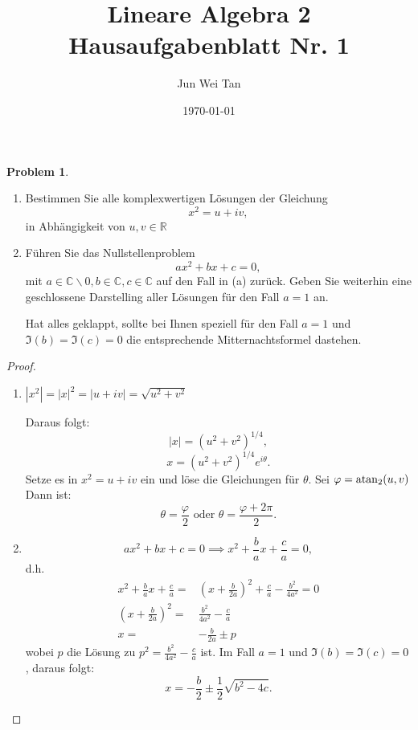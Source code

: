 \documentclass[prb,12pt]{revtex4-2}
\theoremstyle{definition}
\newtheorem{Problem}{Problem}
\theoremstyle{definition}
\newenvironment{parts}{\begin{enumerate}[label=(\alph*)]}{\end{enumerate}}
\newcommand{\R}{\mathbb{R}}
\newcommand{\C}{\mathbb{C}}
\begin{document}
	\title{Lineare Algebra 2 Hausaufgabenblatt Nr. 1}
	\author{Jun Wei Tan}
	\date{\today}
	\maketitle

\begin{Problem}
	\begin{parts}	
		\item Bestimmen Sie alle komplexwertigen Lösungen der Gleichung
	\[
	x^2=u+iv,\] 
	in Abh\"{a}ngigkeit von $u,v\in \R$

\item F\"{u}hren Sie das Nullstellenproblem
	\[
		ax^2+bx+c=0,\]
		mit $a\in\C\backslash 0, b\in \C, c\in \C$ auf den Fall in (a) zur\"{u}ck. Geben Sie weiterhin eine geschlossene Darstelling aller L\"{o}sungen f\"{u}r den Fall $a=1$ an.

		Hat alles geklappt, sollte bei Ihnen speziell für den Fall $a = 1$ und $\Im(b) = \Im(c) = 0$ die entsprechende Mitternachtsformel dastehen.
		\end{parts}
\end{Problem}
\begin{proof}
	\begin{parts}
	\item $\left| x^2 \right| =|x|^2=|u+iv|=\sqrt{u^2+v^2}$ 

		Daraus folgt:
		\[
			|x|=(u^2+v^2)^{1 / 4}
		,\]
		\[
			x=(u^2+v^2)^{1 / 4}e^{i\theta} 
		.\] 
		Setze es in $x^2=u+iv$ ein und löse die Gleichungen für $\theta$. Sei $\varphi=\atan_2(u,v)$ Dann ist:
		 \[
			 \theta=\frac{\varphi}{2}\text{ oder }\theta=\frac{\varphi+2\pi}{2}
		 .\]

	\item \[
			ax^2+bx+c=0\implies x^2+\frac{b}{a}x+\frac{c}{a}=0
	,\]
	d.h.
	\begin{align*}
		x^2+\frac{b}{a}x+\frac{c}{a}=& \left( x+\frac{b}{2a} \right)^2+\frac{c}{a}-\frac{b^2}{4a^2}=0\\
		\left( x+\frac{b}{2a} \right)^2=&\frac{b^2}{4a^2}-\frac{c}{a}\\
		x=&-\frac{b}{2a}\pm p
	\end{align*}
	wobei $p$ die L\"{o}sung zu $p^2=\frac{b^2}{4a^2}-\frac{c}{a}$ ist. Im Fall $a=1$ und $\Im(b)=\Im(c)=0$, daraus folgt: 
	\[
	x=-\frac{b}{2}\pm \frac{1}{2}\sqrt{b^2-4c} 
	.\] 
	\end{parts}
\end{proof}
\end{document}
